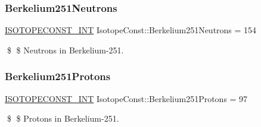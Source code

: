 \subsubsection{\texorpdfstring{Berkelium251\+Neutrons}{Berkelium251Neutrons}}
{\footnotesize\ttfamily \mbox{\hyperlink{group___isotope_const-_macros_ga5f18360b3e99483a35c32d789e62621c}{I\+S\+O\+T\+O\+P\+E\+C\+O\+N\+S\+T\+\_\+\+I\+NT}} Isotope\+Const\+::\+Berkelium251\+Neutrons = 154}

\$ \$ Neutrons in Berkelium-\/251. \mbox{\label{group___isotope_const-_berkelium-_bk251_ga503cfc88e007bd622bcacf3d1ebe8e59}} 
\subsubsection{\texorpdfstring{Berkelium251\+Protons}{Berkelium251Protons}}
{\footnotesize\ttfamily \mbox{\hyperlink{group___isotope_const-_macros_ga5f18360b3e99483a35c32d789e62621c}{I\+S\+O\+T\+O\+P\+E\+C\+O\+N\+S\+T\+\_\+\+I\+NT}} Isotope\+Const\+::\+Berkelium251\+Protons = 97}

\$ \$ Protons in Berkelium-\/251. 